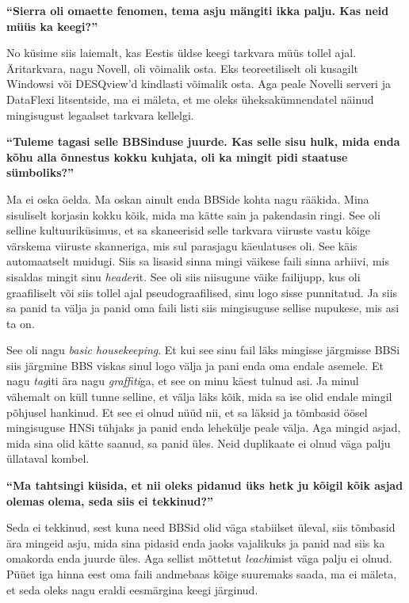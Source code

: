 \textbf{\enquote{Sierra oli omaette fenomen, tema asju mängiti ikka palju. Kas 
neid müüs ka keegi?}}

No küsime siis laiemalt, kas Eestis üldse keegi tarkvara müüs tollel ajal. 
Äritarkvara, nagu Novell, oli võimalik osta. Eks teoreetiliselt oli kusagilt 
Windowsi või DESQview'd  kindlasti võimalik osta. Aga peale Novelli serveri ja DataFlexi 
litsentside, ma ei mäleta, et me oleks üheksakümnendatel näinud mingisugust 
legaalset tarkvara kellelgi. 


\textbf{\enquote{Tuleme tagasi selle BBSinduse juurde. Kas selle sisu hulk, 
mida enda kõhu alla õnnestus kokku kuhjata, oli ka mingit pidi staatuse 
sümboliks?}}

Ma ei oska öelda. Ma oskan ainult enda BBSide kohta nagu rääkida. Mina 
sisuliselt korjasin kokku kõik, mida ma kätte sain ja pakendasin ringi. See 
oli selline kultuuriküsimus, et sa skaneerisid selle tarkvara viiruste vastu 
kõige värskema viiruste skanneriga, mis sul parasjagu käeulatuses oli. See käis 
automaatselt muidugi. Siis sa lisasid sinna mingi väikese faili sinna arhiivi, 
mis sisaldas mingit sinu \emph{header}it. See oli siis niisugune väike 
failijupp, kus oli graafiliselt või siis tollel ajal pseudograafilised, sinu 
logo sisse punnitatud. Ja siis sa panid ta välja ja panid oma faili listi siis 
mingisuguse sellise nupukese, mis asi ta on. 

See oli nagu \emph{basic housekeeping}. Et kui see sinu fail läks mingisse 
järgmisse BBSi siis järgmine BBS viskas sinul logo välja ja pani enda oma 
endale  asemele. Et nagu \emph{tag}iti ära nagu \emph{graffiti}ga, et see on 
minu käest tulnud asi. Ja minul vähemalt on küll tunne selline, et välja läks 
kõik, mida sa ise olid endale mingil põhjusel hankinud. Et see ei olnud nüüd 
nii, et sa läksid ja tõmbasid öösel mingisuguse HNSi tühjaks ja 
panid enda lehekülje peale välja. Aga mingid asjad, mida sina olid kätte 
saanud, sa panid üles. Neid duplikaate ei olnud väga palju üllataval kombel.

\textbf{\enquote{Ma tahtsingi küsida, et nii oleks pidanud üks hetk ju kõigil 
kõik asjad olemas olema, seda siis ei tekkinud?}}

Seda ei tekkinud, sest kuna need BBSid olid väga stabiilset üleval, siis 
tõmbasid ära mingeid asju, mida sina pidasid enda jaoks vajalikuks ja panid nad 
siis ka omakorda enda juurde üles. Aga sellist mõttetut \emph{leach}imist  väga 
palju ei olnud. Püüet iga hinna eest oma faili andmebaas kõige suuremaks saada, 
ma ei mäleta, et seda oleks nagu eraldi eesmärgina keegi järginud. 

